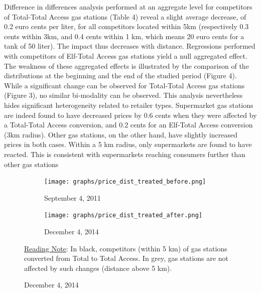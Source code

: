 \documentclass[english]{article}
\begin{document}
Difference in differences analysis performed at an aggregate level for competitors of Total-Total Access gas stations (Table 4) reveal a slight average decrease, of 0.2 euro cents per liter, for all competitors located within 5km (respectively 0.3 cents within 3km, and 0.4 cents within 1 km, which means 20 euro cents for a tank of 50 liter). The impact thus decreases with distance. Regressions performed with competitors of Elf-Total Access gas stations yield a null aggregated effect. The weakness of these aggregated effects is illustrated by the comparison of the distributions at the beginning and the end of the studied period (Figure 4). While a significant change can be observed for Total-Total Access gas stations (Figure 3), no similar bi-modality can be observed. This analysis nevertheless hides significant heterogeneity related to retailer types. Supermarket gas stations are indeed found to have decreased prices by 0.6 cents when they were affected by a Total-Total Access conversion, and 0.2 cents for an Elf-Total Access conversion (3km radius). Other gas stations, on the other hand, have slightly increased prices in both cases. Within a 5 km radius, only supermarkets are found to have reacted. This is consistent with supermarkets reaching consumers further than other gas stations \medskip{}

\begin{figure}[H]
\centering
\caption{Distributions of Total Access competitor prices vs .others}
\label{fig:price_dist_total_ba}
\begin{subfigure}[t]{.49\columnwidth}
\centering
\texttt{[image: graphs/price\_dist\_treated\_before.png]}
\caption[short]{September 4, 2011}
\end{subfigure}
\begin{subfigure}[t]{.49\columnwidth}
\centering
\texttt{[image: graphs/price\_dist\_treated\_after.png]}
\caption[short]{December 4, 2014}
\end{subfigure}
\flushleft
{\small{}\uline{Reading Note}}{\small{}: In black, competitors (within 5 km) of gas stations converted from Total to Total Access. In grey, gas stations are not affected by such changes (distance above 5 km).}{\small \par}
\end{figure}
\end{document}
